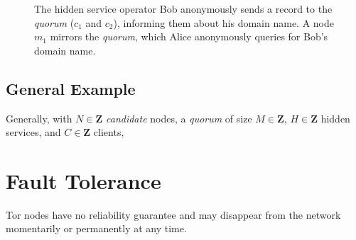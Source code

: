 \begin{figure}[htbp]
	\caption{The hidden service operator Bob anonymously sends a record to the \emph{quorum} ($ c_{1} $ and $ c_{2} $), informing them about his domain name. A node $ m_{1} $ mirrors the \emph{quorum}, which Alice anonymously queries for Bob's domain name.}
	\label{fig:bigPicture}
\end{figure}

\subsection{General Example}

Generally, with $ N \in \textbf{Z} $ \emph{candidate} nodes, a \emph{quorum} of size $ M \in \textbf{Z} $, $ H \in \textbf{Z} $ hidden services, and $ C \in \textbf{Z} $ clients,

\section{Fault Tolerance}

Tor nodes have no reliability guarantee and may disappear from the network momentarily or permanently at any time. 



